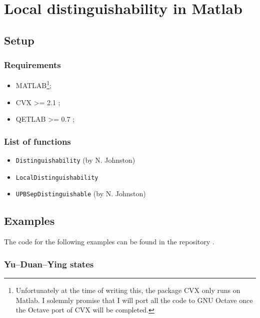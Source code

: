 \chapter{Local distinguishability in Matlab}
\label{chap:AppendixA}


\section*{Setup}
\subsection*{Requirements}

\begin{itemize}
    \item MATLAB\footnote{Unfortunately at the time of writing this, 
        the package CVX only runs on Matlab. I solemnly promise that I will port
        all the code to GNU Octave once the Octave port of CVX will be completed.};
    \item CVX  \textgreater= 2.1 \cite{cvx};
    \item QETLAB \textgreater= 0.7 \cite{Johnston2015};
\end{itemize}

\subsection*{List of functions}

\begin{itemize}
    \item \texttt{Distinguishability} (by N. Johnston)
    \item \texttt{LocalDistinguishability}
    \item \texttt{UPBSepDistinguishable} (by N. Johnston)
\end{itemize}

\sloppy
{}
\setlength{\parindent}{0pt}

\section*{Examples}

The code for the following examples can be found in the repository \cite{Cosentino15}. 

\subsection*{Yu--Duan--Ying states}

